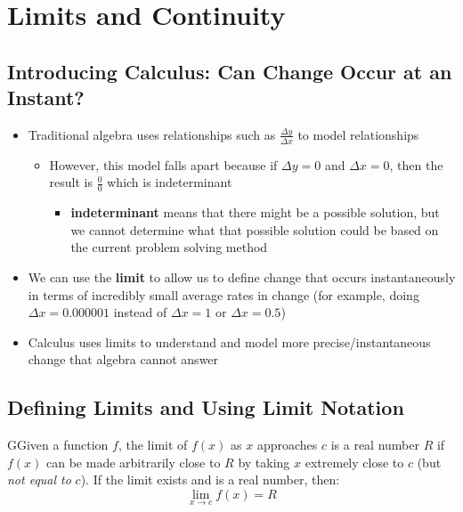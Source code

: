 \documentclass{package/notes}
\begin{document}
\chapter{Limits and Continuity}

\section{Introducing Calculus: Can Change Occur at an Instant?}
\begin{itemize}
	\item Traditional algebra uses relationships such as $\frac{\Delta y}{\Delta x}$ to model relationships
	\begin{itemize}
		\item However, this model falls apart because if $\Delta y = 0$ and $\Delta x = 0$, then the result is $\frac{0}{0}$ which is indeterminant
		\begin{itemize}
			\item \textbf{indeterminant} means that there might be a possible solution, but we cannot determine what that possible solution could be based on the current problem solving method
		\end{itemize}
	\end{itemize}

	\item We can use the \textbf{limit} to allow us to define change that occurs instantaneously in terms of incredibly small average rates in change (for example, doing $\Delta x = 0.000001$ instead of $\Delta x = 1$ or $\Delta x = 0.5$)
	\item Calculus uses limits to understand and model more precise/instantaneous change that algebra cannot answer
\end{itemize}

\section{Defining Limits and Using Limit Notation}
\begin{definition}
	GGiven a function $f$, the limit of $f(x)$ as $x$ approaches $c$ is a real number $R$ if $f(x)$ can be made arbitrarily close to $R$ by taking $x$ extremely close to $c$ (but \textit{not equal to} $c$).
	\newline\newline
	If the limit exists and is a real number, then:
	$$ \lim_{x\to c}f(x) = R$$
\end{definition}
\end{document}
